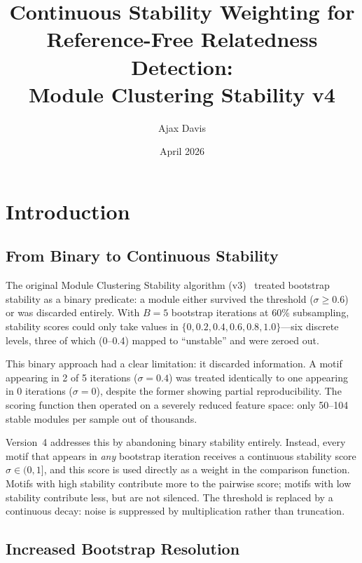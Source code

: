 \documentclass{../yalumba}
\title{Continuous Stability Weighting for\\Reference-Free Relatedness Detection:\\Module Clustering Stability v4}
\author{Ajax Davis}
\date{April 2026}
\begin{document}
\maketitle

\tableofcontents
\newpage

\section{Introduction}
\label{sec:intro}

\subsection{From Binary to Continuous Stability}

The original Module Clustering Stability algorithm
(v3)~\cite{efron1979bootstrap, hennig2007cluster} treated bootstrap stability as
a binary predicate: a module either survived the threshold ($\sigma \geq 0.6$)
or was discarded entirely.  With $B = 5$ bootstrap iterations at 60\%
subsampling, stability scores could only take values in $\{0, 0.2, 0.4, 0.6,
0.8, 1.0\}$---six discrete levels, three of which (0--0.4) mapped to
``unstable'' and were zeroed out.


This binary approach had a clear limitation: it discarded information.  A motif
appearing in 2 of 5 iterations ($\sigma = 0.4$) was treated identically to one
appearing in 0 iterations ($\sigma = 0$), despite the former showing partial
reproducibility.  The scoring function then operated on a severely reduced
feature space: only 50--104 stable modules per sample out of thousands.

Version~4 addresses this by abandoning binary stability entirely.  Instead,
every motif that appears in \emph{any} bootstrap iteration receives a continuous
stability score $\sigma \in (0, 1]$, and this score is used directly as a
weight in the comparison function.  Motifs with high stability contribute more
to the pairwise score; motifs with low stability contribute less, but are not
silenced.  The threshold is replaced by a continuous decay: noise is suppressed
by multiplication rather than truncation.

\subsection{Increased Bootstrap Resolution}
\end{document}
